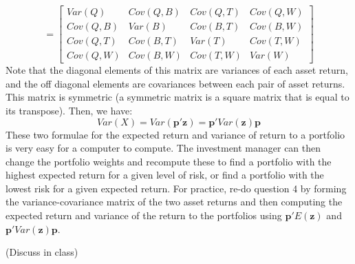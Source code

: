 \documentclass[12pt]{report}
\begin{document}
{$$=
\begin{bmatrix}
Var(Q) & Cov(Q,B) & Cov(Q,T) & Cov(Q,W) \\
Cov(Q,B) & Var(B) & Cov(B,T) & Cov(B,W) \\
Cov(Q,T) & Cov(B,T) & Var(T) & Cov(T,W) \\
Cov(Q,W) & Cov(B,W) & Cov(T,W) & Var(W)
\end{bmatrix}$$ Note that the diagonal elements of this matrix are variances of each asset return, and the off diagonal elements are covariances between each pair of asset returns. This matrix is symmetric (a symmetric matrix is a square matrix that is equal to its transpose). Then, we have: $$Var(X) = Var(\textbf{p}'\textbf{z}) = \textbf{p}'Var(\textbf{z})\textbf{p}$$ These two formulae for the expected return and variance of return to a portfolio is very easy for a computer to compute. The investment manager can then change the portfolio weights and recompute these to find a portfolio with the highest expected return for a given level of risk, or find a portfolio with the lowest risk for a given expected return. For practice, re-do question 4 by forming the variance-covariance matrix of the two asset returns and then computing the expected return and variance of the return to the portfolios using $\textbf{p}'E(\textbf{z})$ and $\textbf{p}'Var(\textbf{z})\textbf{p}$.}

\noindent (Discuss in class)
\end{document}
